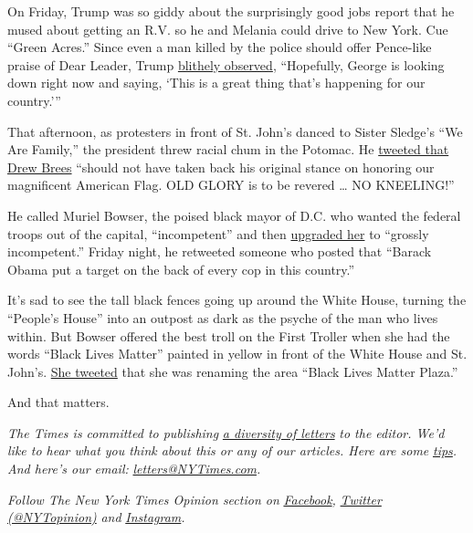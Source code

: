 On Friday, Trump was so giddy about the surprisingly good jobs report
that he mused about getting an R.V. so he and Melania could drive to New
York. Cue ``Green Acres.'' Since even a man killed by the police should
offer Pence-like praise of Dear Leader, Trump
\href{https://www.nytimes3xbfgragh.onion/2020/06/05/us/politics/trump-jobs-report-george-floyd.html}{blithely
observed}, ``Hopefully, George is looking down right now and saying,
`This is a great thing that's happening for our country.'''

That afternoon, as protesters in front of St. John's danced to Sister
Sledge's ``We Are Family,'' the president threw racial chum in the
Potomac. He
\href{https://twitter.com/realDonaldTrump/status/1268998142860627969}{tweeted
that Drew Brees} ``should not have taken back his original stance on
honoring our magnificent American Flag. OLD GLORY is to be revered
\ldots{} NO KNEELING!''

He called Muriel Bowser, the poised black mayor of D.C. who wanted the
federal troops out of the capital, ``incompetent'' and then
\href{https://twitter.com/realdonaldtrump/status/1269043981461184514}{upgraded
her} to ``grossly incompetent.'' Friday night, he retweeted someone who
posted that ``Barack Obama put a target on the back of every cop in this
country.''

It's sad to see the tall black fences going up around the White House,
turning the ``People's House'' into an outpost as dark as the psyche of
the man who lives within. But Bowser offered the best troll on the First
Troller when she had the words ``Black Lives Matter'' painted in yellow
in front of the White House and St. John's.
\href{https://twitter.com/MayorBowser/status/1268928589975695361?s=20}{She
tweeted} that she was renaming the area ``Black Lives Matter Plaza.''

And that matters.

\emph{The Times is committed to publishing}
\href{https://www.nytimes3xbfgragh.onion/2019/01/31/opinion/letters/letters-to-editor-new-york-times-women.html}{\emph{a
diversity of letters}} \emph{to the editor. We'd like to hear what you
think about this or any of our articles. Here are some}
\href{https://help.nytimes3xbfgragh.onion/hc/en-us/articles/115014925288-How-to-submit-a-letter-to-the-editor}{\emph{tips}}\emph{.
And here's our email:}
\href{mailto:letters@NYTimes.com}{\emph{letters@NYTimes.com}}\emph{.}

\emph{Follow The New York Times Opinion section on}
\href{https://www.facebookcorewwwi.onion/nytopinion}{\emph{Facebook}}\emph{,}
\href{http://twitter.com/NYTOpinion}{\emph{Twitter (@NYTopinion)}}
\emph{and}
\href{https://www.instagram.com/nytopinion/}{\emph{Instagram}}\emph{.}

